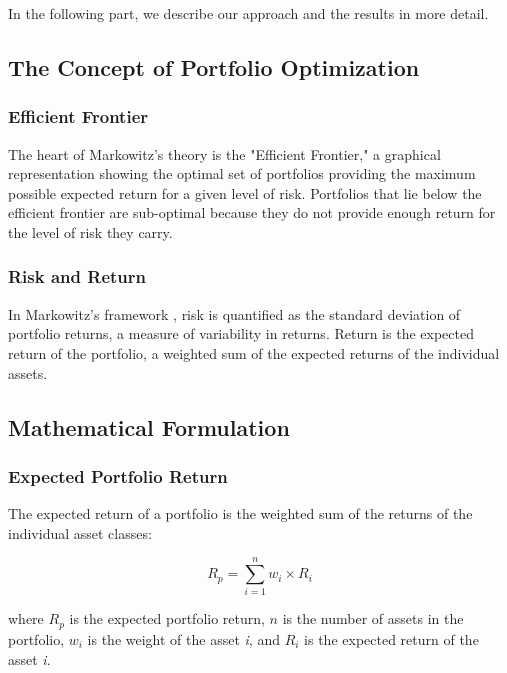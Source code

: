 \documentclass{article}
\begin{document}
In the following part, we describe our approach and the results in more detail. 

\subsection{The Concept of Portfolio Optimization}

\subsubsection*{Efficient Frontier}

The heart of Markowitz's theory \cite{markowitz1952} is the "Efficient Frontier," a graphical representation showing the optimal set of portfolios providing the maximum possible expected return for a given level of risk. Portfolios that lie below the efficient frontier are sub-optimal because they do not provide enough return for the level of risk they carry.

\subsubsection*{Risk and Return}

In Markowitz's framework \cite{markowitz1952}, risk is quantified as the standard deviation of portfolio returns, a measure of variability in returns. Return is the expected return of the portfolio, a weighted sum of the expected returns of the individual assets.

\subsection{Mathematical Formulation}

\subsubsection*{Expected Portfolio Return}

The expected return of a portfolio is the weighted sum of the returns of the individual asset classes:

\begin{equation}
R_p = \sum_{i=1}^{n} w_i \times R_i
\end{equation}

where \( R_p \) is the expected portfolio return, \( n \) is the number of assets in the portfolio, \( w_i \) is the weight of the asset \textit{i}, and \( R_i \) is the expected return of the asset \textit{i}.
\end{document}
